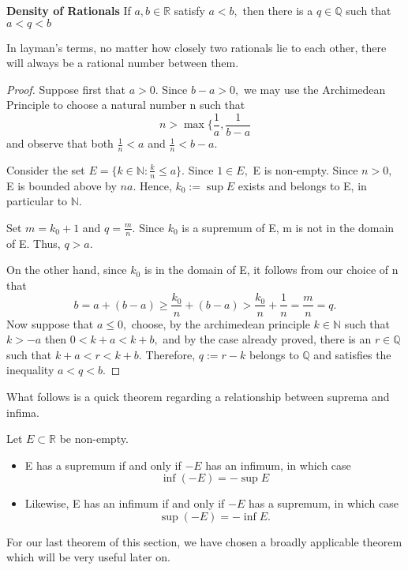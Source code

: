 \begin{theorem}\textbf{Density of Rationals}\newline
If $a,b \in \mathbb{R}$ satisfy $a<b,$ then there is a $q\in \mathbb{Q}$ such that $a < q < b$
\end{theorem}
In layman’s terms, no matter how closely two rationals lie to each other, there will always be a rational number between them.
\begin{proof}
Suppose first that $a > 0.$ Since $b-a >0,$ we may use the Archimedean Principle to choose a natural number n such that $$n > \max \{\frac{1}{a},\frac{1}{b-a}$$ and observe that both $\frac{1}{n} < a$ and $\frac{1}{n} < b-a.$\newline

Consider the set $E = \{k\in \mathbb{N}:\frac{k}{n} \leq a\}.$ Since $1\in E,$ E is non-empty. Since $n > 0,$ E is bounded above by $na.$ Hence, $k_0 := \sup E$ exists and belongs to E, in particular to $\mathbb{N}.$\newline

Set $m=k_0+1$ and $ q= \frac{m}{n}.$ Since $k_0$ is a supremum of E, m is not in the domain of E. Thus, $q > a.$\newline

On the other hand, since $k_0$ is in the domain of E, it follows from our choice of n that
$$b = a+(b-a) \geq \frac{k_0}{n} + (b-a) > \frac{k_0}{n} + \frac{1}{n} = \frac{m}{n} = q.$$
Now suppose that $a \leq 0,$ choose, by the archimedean principle $k \in \mathbb{N}$ such that $k > -a$ then $0<k+a<k+b,$ and by the case already proved, there is an $r \in \mathbb{Q}$ such that $k+a<r<k+b.$ Therefore, $q:=r-k$ belongs to $\mathbb{Q}$ and satisfies the inequality $a<q<b.$
\end{proof}

What follows is a quick theorem regarding a relationship between suprema and infima.

\begin{theorem}
Let $E \subset \mathbb{R}$ be non-empty.
\begin{itemize}
\item E has a supremum if and only if $-E$ has an infimum, in which case $$\inf (-E) = -\sup E$$
\item Likewise, E has an infimum if and only if $-E$ has a supremum, in which case $$\sup(-E) = -\inf E.$$
\end{itemize}
\end{theorem}

For our last theorem of this section, we have chosen a broadly applicable theorem which will be very useful later on.

